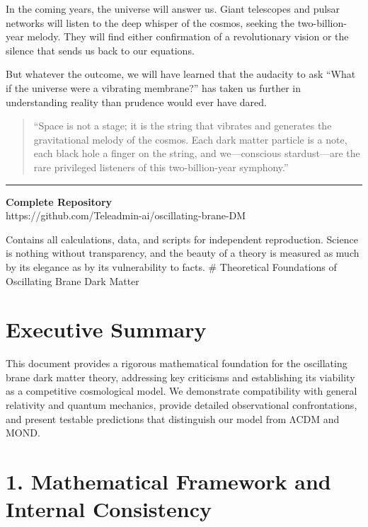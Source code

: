 \documentclass[
  11pt,
]{report}
\begin{document}
In the coming years, the universe will answer us. Giant telescopes and
pulsar networks will listen to the deep whisper of the cosmos, seeking
the two-billion-year melody. They will find either confirmation of a
revolutionary vision or the silence that sends us back to our equations.

But whatever the outcome, we will have learned that the audacity to ask
``What if the universe were a vibrating membrane?'' has taken us further
in understanding reality than prudence would ever have dared.

\begin{quote}
``Space is not a stage; it is the string that vibrates and generates the
gravitational melody of the cosmos. Each dark matter particle is a note,
each black hole a finger on the string, and we---conscious
stardust---are the rare privileged listeners of this two-billion-year
symphony.''
\end{quote}

\begin{center}\rule{0.5\linewidth}{0.5pt}\end{center}

\textbf{Complete Repository}\\
https://github.com/Teleadmin-ai/oscillating-brane-DM

Contains all calculations, data, and scripts for independent
reproduction. Science is nothing without transparency, and the beauty of
a theory is measured as much by its elegance as by its vulnerability to
facts. \newpage \# Theoretical Foundations of Oscillating Brane Dark
Matter

\section{Executive Summary}\label{executive-summary-1}

This document provides a rigorous mathematical foundation for the
oscillating brane dark matter theory, addressing key criticisms and
establishing its viability as a competitive cosmological model. We
demonstrate compatibility with general relativity and quantum mechanics,
provide detailed observational confrontations, and present testable
predictions that distinguish our model from ΛCDM and MOND.

\section{1. Mathematical Framework and Internal
Consistency}\label{mathematical-framework-and-internal-consistency}
\end{document}
